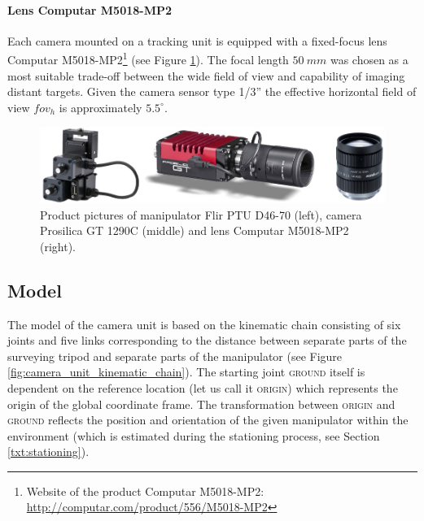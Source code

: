 \paragraph{Lens Computar M5018-MP2} Each camera mounted on a tracking unit is equipped with a fixed-focus lens Computar M5018-MP2\footnote{Website of the product Computar M5018-MP2: \url{http://computar.com/product/556/M5018-MP2}} (see Figure \ref{fig:prosilica_gt1290c_flir_ptud4670}). The focal length $50~mm$ was chosen as a most suitable trade-off between the wide field of view and capability of imaging distant targets. Given the camera sensor type 1/3'' the effective horizontal field of view $fov_{h}$ is approximately $5.5^{\circ}$.

\begin{figure}[htb]
	\centering
	\includegraphics[width=0.9\linewidth]{fig/prosilica_gt1290c_flir_ptud4670_computar.png}
	\caption{Product pictures of manipulator Flir PTU D46-70 (left), camera Prosilica GT 1290C (middle) and lens Computar M5018-MP2 (right).}
	\label{fig:prosilica_gt1290c_flir_ptud4670}
\end{figure}

\subsection{Model} \label{txt:model}

The model of the camera unit is based on the kinematic chain consisting of six joints and five links corresponding to the distance between separate parts of the surveying tripod and separate parts of the manipulator (see Figure \ref{fig:camera_unit_kinematic_chain}). The starting joint \textsc{ground} itself is dependent on the reference location (let us call it \textsc{origin}) which represents the origin of the global coordinate frame. The transformation between \textsc{origin} and \textsc{ground} reflects the position and orientation of the given manipulator within the environment (which is estimated during the stationing process, see Section \ref{txt:stationing}).

